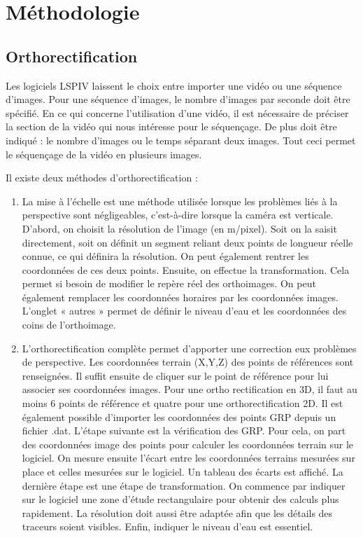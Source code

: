 \documentclass[
]{article}
\begin{document}
\hypertarget{principle}{%
\section{Méthodologie}\label{principle}}

\hypertarget{orthorectification}{%
\subsection{Orthorectification}\label{orthorectification}}

Les logiciels LSPIV laissent le choix entre importer une vidéo ou une séquence d'images.
Pour une séquence d'images, le nombre d'images par seconde doit être spécifié.
En ce qui concerne l'utilisation d'une vidéo, il est nécessaire de préciser la section de la vidéo qui nous intéresse pour le séquençage. De plus doit être indiqué : le nombre d'images ou le temps séparant deux images. Tout ceci permet le séquençage de la vidéo en plusieurs images.

Il existe deux méthodes d'orthorectification :

\begin{enumerate}
\def\labelenumi{\arabic{enumi}.}
\item
  La mise à l'échelle est une méthode utilisée lorsque les problèmes liés à la perspective sont négligeables, c'est-à-dire lorsque la caméra est verticale. D'abord, on choisit la résolution de l'image (en m/pixel). Soit on la saisit directement, soit on définit un segment reliant deux points de longueur réelle connue, ce qui définira la résolution. On peut également rentrer les coordonnées de ces deux points. Ensuite, on effectue la transformation. Cela permet si besoin de modifier le repère réel des orthoimages. On peut également remplacer les coordonnées horaires par les coordonnées images. L'onglet « autres » permet de définir le niveau d'eau et les coordonnées des coins de l'orthoimage.
\item
  L'orthorectification complète permet d'apporter une correction eux problèmes de perspective. Les coordonnées terrain (X,Y,Z) des points de références sont renseignées. Il suffit ensuite de cliquer sur le point de référence pour lui associer ses coordonnées images. Pour une ortho rectification en 3D, il faut au moins 6 points de référence et quatre pour une orthorectification 2D. Il est également possible d'importer les coordonnées des points GRP depuis un fichier .dat. L'étape suivante est la vérification des GRP. Pour cela, on part des coordonnées image des points pour calculer les coordonnées terrain sur le logiciel. On mesure ensuite l'écart entre les coordonnées terrains mesurées sur place et celles mesurées sur le logiciel. Un tableau des écarts est affiché. La dernière étape est une étape de transformation. On commence par indiquer sur le logiciel une zone d'étude rectangulaire pour obtenir des calculs plus rapidement. La résolution doit aussi être adaptée afin que les détails des traceurs soient visibles. Enfin, indiquer le niveau d'eau est essentiel.
\end{enumerate}
\end{document}

